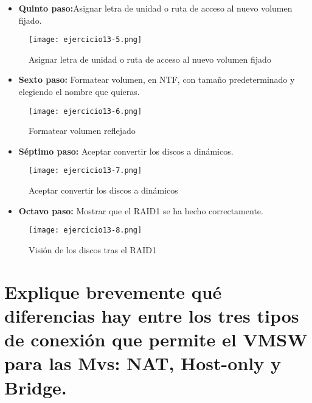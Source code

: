 	\begin{itemize}
		\item \textbf{Quinto paso:}Asignar letra de unidad o ruta de acceso al nuevo volumen fijado.
	\end{itemize}
	
	\begin{figure}[H]
		\centering
		\texttt{[image: ejercicio13-5.png]}  
		\label{figura22}
		\caption{Asignar letra de unidad o ruta de acceso al nuevo volumen fijado} 
	\end{figure}
	
	\begin{itemize}
		\item \textbf{Sexto paso:} Formatear volumen, en NTF, con tamaño predeterminado y elegiendo el nombre que quieras.
	\end{itemize}
	
	\begin{figure}[H]
		\centering
		\texttt{[image: ejercicio13-6.png]}  
		\label{figura23}
		\caption{Formatear volumen reflejado} 
	\end{figure}
	
	\begin{itemize}
		\item \textbf{Séptimo paso:} Aceptar convertir los discos a dinámicos.
	\end{itemize}
	
	\begin{figure}[H]
		\centering
		\texttt{[image: ejercicio13-7.png]}  
		\label{figura24}
		\caption{Aceptar convertir los discos a dinámicos} 
	\end{figure}
	
	\begin{itemize}
		\item \textbf{Octavo paso:} Mostrar que el RAID1 se ha hecho correctamente.
	\end{itemize}
	
	\begin{figure}[H]
		\centering
		\texttt{[image: ejercicio13-8.png]}  
		\label{figura25}
		\caption{Visión de los discos tras el RAID1} 
	\end{figure}
	
	
	
	
	\section{Explique brevemente qué diferencias hay entre los tres tipos de conexión que permite el VMSW para las Mvs: NAT, Host-only y Bridge.}
	
